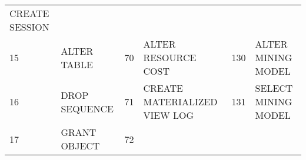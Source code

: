\begin{longtable}[]{@{}llllll@{}}
\begin{minipage}[t]{0.24\columnwidth}
CREATE SESSION\strut
\end{minipage}\tabularnewline
\begin{minipage}[t]{0.06\columnwidth}\raggedright\strut
15\strut
\end{minipage} & \begin{minipage}[t]{0.19\columnwidth}\raggedright\strut
ALTER TABLE\strut
\end{minipage} & \begin{minipage}[t]{0.06\columnwidth}\raggedright\strut
70\strut
\end{minipage} & \begin{minipage}[t]{0.24\columnwidth}\raggedright\strut
ALTER RESOURCE COST\strut
\end{minipage} & \begin{minipage}[t]{0.06\columnwidth}\raggedright\strut
130\strut
\end{minipage} & \begin{minipage}[t]{0.24\columnwidth}\raggedright\strut
ALTER MINING MODEL\strut
\end{minipage}\tabularnewline
\begin{minipage}[t]{0.06\columnwidth}\raggedright\strut
16\strut
\end{minipage} & \begin{minipage}[t]{0.19\columnwidth}\raggedright\strut
DROP SEQUENCE\strut
\end{minipage} & \begin{minipage}[t]{0.06\columnwidth}\raggedright\strut
71\strut
\end{minipage} & \begin{minipage}[t]{0.24\columnwidth}\raggedright\strut
CREATE MATERIALIZED VIEW LOG\strut
\end{minipage} & \begin{minipage}[t]{0.06\columnwidth}\raggedright\strut
131\strut
\end{minipage} & \begin{minipage}[t]{0.24\columnwidth}\raggedright\strut
SELECT MINING MODEL\strut
\end{minipage}\tabularnewline
\begin{minipage}[t]{0.06\columnwidth}\raggedright\strut
17\strut
\end{minipage} & \begin{minipage}[t]{0.19\columnwidth}\raggedright\strut
GRANT OBJECT\strut
\end{minipage} & \begin{minipage}[t]{0.06\columnwidth}\raggedright\strut
72\strut
\end{minipage} & \begin{minipage}[t]{0.24\columnwidth}\raggedright\strut

\end{minipage}
\end{longtable}
